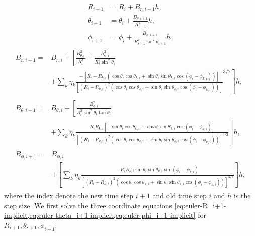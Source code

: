 \begin{align}
    R_{i+1} &= R_i + B_{r,i+1} h \label{eq:euler-R_i+1-implicit}, \\[0.4cm]
    \theta_{i+1} &= \theta_i + \frac{B_{\theta,i+1}}{R_{i+1}^2} h, \label{eq:euler-theta_i+1-implicit} \\[0.4cm]
    \phi_{i+1} &= \phi_i + \frac{B_{\phi,i+1}}{R_{i+1}^2 \sin^2{\theta_{i+1}}} h, \label{eq:euler-phi_i+1-implicit}
\end{align}
\begin{align}    
    \begin{aligned}
        B_{r,i+1} = & B_{r,i} + \left[ \frac{B_{\theta,i}^2}{R_i^3} + \frac{B_{\phi,i}^2}{R_i^3 \sin^2{\theta_i}} \right. \\
        & + \left. {} \sum\limits_{k} \eta_k \frac{-\left[R_i - R_{k,i} \left(\cos{\theta_i}\cos{\theta_{k,i}} + \sin{\theta_i}\sin{\theta_{k,i}}\cos{(\phi_i - \phi_{k,i})}\right) \right]}{\left[(R_i - R_{k,i})^2 \left(\cos{\theta_i}\cos{\theta_{k,i}} + \sin{\theta_i}\sin{\theta_{k,i}}\cos{(\phi_i - \phi_{k,i})} \right) \right]}^{3/2} \right] h , \label{eq:euler-Br_i+1-explicit}
    \end{aligned} \\[0.4cm]
    \begin{aligned}
        B_{\theta,i+1} = & B_{\theta,i} + \left[ \frac{B_{\phi,i}^2}{R_i^2 \sin^2{\theta_i} \tan{\theta_i}} \right. \\
        & + \left. {} \sum\limits_{k} \eta_k \frac{R_i R_{k,i} \left[-\sin{\theta_i}\cos{\theta_{k,i}} + \cos{\theta_i}\sin{\theta_{k,i}}\cos{(\phi_i - \phi_{k,i})} \right]}{\left[(R_i - R_{k,i})^2 \left(\cos{\theta_i}\cos{\theta_{k,i}} + \sin{\theta_i}\sin{\theta_{k,i}}\cos{(\phi_i - \phi_{k,i})} \right) \right]^{3/2}} \right] h, \label{eq:euler-Btheta_i+1-explicit}
    \end{aligned} \\[0.4cm]
    \begin{aligned}
        B_{\phi,i+1} = & B_{\phi,i} \\
        & + \left[ \sum\limits_{k} \eta_k \frac{- R_i R_{k,i} \sin{\theta_i}\sin{\theta_{k,i}}\sin{(\phi_i - \phi_{k,i})}}{\left[(R_i - R_{k,i})^2 \left(\cos{\theta_i}\cos{\theta_{k,i}} + \sin{\theta_i}\sin{\theta_{k,i}}\cos{(\phi_i - \phi_{k,i})} \right) \right]^{3/2}} \right] h , \label{eq:euler-Bphi_i+1-explicit}
    \end{aligned}
\end{align}
where the index denote the new time step \(i+1\) and old time step \(i\) and \(h\) is the step size.
We first solve the three coordinate equations \cref{eq:euler-R_i+1-implicit,eq:euler-theta_i+1-implicit,eq:euler-phi_i+1-implicit} for \(R_{i+1}, \theta_{i+1}, \phi_{i+1}\):

